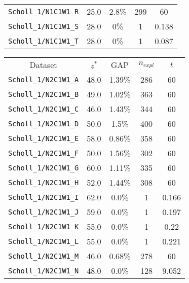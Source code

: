 \begin{figure}[!ht]
{\begin{minipage}{0.47\linewidth}
\begin{tabular}{|ccccc|}
			\texttt{Scholl\_1/N1C1W1\_R} & 25.0           & 2.8\% & 299               & 60       \\
			\texttt{Scholl\_1/N1C1W1\_S} & 28.0           & 0\% & 1               & 0.138       \\
			\texttt{Scholl\_1/N1C1W1\_T} & 28.0           & 0\% & 1               & 0.087       \\
			\hline  
		\end{tabular}
	\end{minipage}
	\begin{minipage}{0.47\linewidth}
		\centering
		\begin{tabular}{|ccccc|}
			\hline
			\rowcolor{gray!50}
			Dataset   & $z^*$ & GAP  & $n_{expl}$ & $t$ \\
			\texttt{Scholl\_1/N2C1W1\_A} & 48.0           & 1.39\% & 286             & 60      \\
			\texttt{Scholl\_1/N2C1W1\_B} & 49.0           & 1.02\% & 363             & 60        \\
			\texttt{Scholl\_1/N2C1W1\_C} & 46.0           & 1.43\% & 344             & 60      \\
			\texttt{Scholl\_1/N2C1W1\_D} & 50.0           & 1.5\%  & 400             & 60      \\
			\texttt{Scholl\_1/N2C1W1\_E} & 58.0           & 0.86\% & 358             & 60      \\
			\texttt{Scholl\_1/N2C1W1\_F} & 50.0           & 1.56\% & 302             & 60      \\
			\texttt{Scholl\_1/N2C1W1\_G} & 60.0           & 1.11\% & 335             & 60      \\
			\texttt{Scholl\_1/N2C1W1\_H} & 52.0           & 1.44\% & 308             & 60      \\
			\texttt{Scholl\_1/N2C1W1\_I} & 62.0           & 0.0\%  & 1               & 0.166       \\
			\texttt{Scholl\_1/N2C1W1\_J} & 59.0           & 0.0\%  & 1               & 0.197       \\
			\texttt{Scholl\_1/N2C1W1\_K} & 55.0           & 0.0\%  & 1               & 0.22        \\
			\texttt{Scholl\_1/N2C1W1\_L} & 55.0           & 0.0\%  & 1               & 0.221       \\
			\texttt{Scholl\_1/N2C1W1\_M} & 46.0           & 0.68\% & 278             & 60       \\
			\texttt{Scholl\_1/N2C1W1\_N} & 48.0           & 0.0\%  & 128             & 9.052       \\

\end{tabular}
\end{minipage}}
\end{figure}
